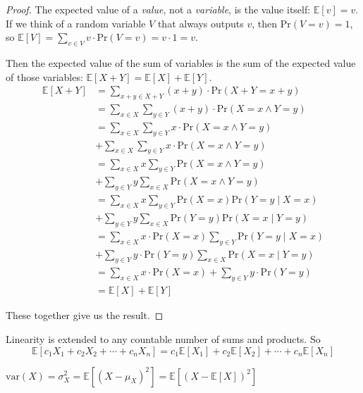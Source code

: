 \documentclass[main.tex]{subfiles}
\begin{document}
\begin{proof}
	The expected value of a \textit{value}, not a \textit{variable}, is the value itself: \(\mathbb{E}[v] = v\). If we think of a random variable \(V\) that always outputs \(v\), then  \(\mathrm{Pr}(V=v) = 1\), so \(\mathbb{E}[V] = \sum_{v \in V} v \cdot \mathrm{Pr}(V = v) = v \cdot 1 = v\).
	
	Then the expected value of the sum of variables is the sum of the expected value of those variables: \(\mathbb{E}[X+Y] = \mathbb{E}[X] + \mathbb{E}[Y]\).
	\begin{align*}
	\mathbb{E}[X+Y] &= \sum_{x+y \in X+Y} (x+y) \cdot \mathrm{Pr}(X+Y = x+y) \\
	&= \sum_{x \in X} \sum_{y \in Y} (x+y) \cdot \mathrm{Pr}(X = x \land Y = y) \\
	&= \sum_{x \in X} \sum_{y \in Y} x \cdot \mathrm{Pr}(X = x \land Y = y) \\
	 &+ \sum_{x \in X} \sum_{y \in Y} x \cdot \mathrm{Pr}(X = x \land Y = y) \\
	&= \sum_{x \in X} x \sum_{y \in Y} \mathrm{Pr}(X = x \land Y = y) \\
	 &+ \sum_{y \in Y} y \sum_{x \in X} \mathrm{Pr}(X = x \land Y = y) \\
	&= \sum_{x \in X} x \sum_{y \in Y} \mathrm{Pr}(X = x)\mathrm{Pr}(Y=y \mid X=x) \\
	 &+ \sum_{y \in Y} y \sum_{x \in X} \mathrm{Pr}(Y = y)\mathrm{Pr}(X=x \mid Y=y) \\
	&= \sum_{x \in X} x \cdot \mathrm{Pr}(X = x) \sum_{y \in Y} \mathrm{Pr}(Y=y \mid X=x) \\
	 &+ \sum_{y \in Y} y \cdot \mathrm{Pr}(Y = y) \sum_{x \in X} \mathrm{Pr}(X=x \mid Y=y) \\
	&= \sum_{x \in X} x \cdot \mathrm{Pr}(X = x) + \sum_{y \in Y} y \cdot \mathrm{Pr}(Y = y) \\
	&= \mathbb{E}[X] + \mathbb{E}[Y]
	\end{align*}
	
	These together give us the result.
\end{proof}

\begin{rem}
	Linearity is extended to any countable number of sums and products. So \[\mathbb{E}[c_1 X_1 + c_2 X_2 + \cdots + c_n X_n] = c_1\mathbb{E}[X_1] + c_2\mathbb{E}[X_2] + \cdots + c_n\mathbb{E}[X_n]\]
\end{rem}

\begin{defn}
	\(\text{var}(X) = \sigma_X^2 = \mathbb{E}[(X-\mu_X)^2] = \mathbb{E}[(X-\mathbb{E}[X])^2]\)
\end{defn}
\end{document}

